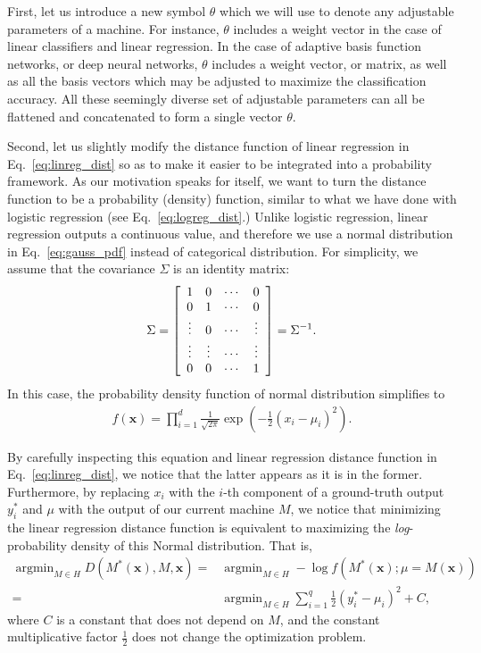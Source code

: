 \documentclass{report}
\newcommand{\vect}[1]{\mathbf{#1}}
\newcommand{\vx}[0]{\vect{x}}
\DeclareMathOperator*{\argmin}{\arg \min}
\begin{document}
First, let us introduce a new symbol $\theta$ which we will use to denote any
adjustable parameters of a machine. For instance, $\theta$ includes a weight
vector in the case of linear classifiers and linear regression. In the case of
adaptive basis function networks, or deep neural networks, $\theta$ includes a
weight vector, or matrix, as well as all the basis vectors which may be adjusted
to maximize the classification accuracy. All these seemingly diverse set of
adjustable parameters can all be flattened and concatenated to form a single
vector $\theta$. 

Second, let us slightly modify the distance function of linear regression in
Eq.~\eqref{eq:linreg_dist} so as to make it easier to be integrated into a
probability framework. As our motivation speaks for itself, we want to turn the
distance function to be a probability (density) function, similar to what we
have done with logistic regression (see Eq.~\eqref{eq:logreg_dist}.) Unlike
logistic regression, linear regression outputs a continuous value, and therefore
we use a normal distribution in Eq.~\eqref{eq:gauss_pdf} instead of categorical
distribution. For simplicity, we assume that the covariance $\Sigma$ is an
identity matrix:
\begin{align*}
    \Sigma = 
    \left[
        \begin{array}{c c c c}
            1 & 0 & \cdots & 0 \\
            0 & 1 & \cdots & 0 \\
            \vdots & 0 & \cdots & \vdots \\
            \vdots & \vdots & \cdots & \vdots \\
            0 & 0 & \cdots & 1 
        \end{array}
    \right] = \Sigma^{-1}.
\end{align*}
In this case, the probability density function of normal distribution simplifies
to 
\begin{align}
    \label{eq:gauss_pdf_identity}
    f(\vx) = \prod_{i=1}^d 
    \frac{1}{\sqrt{2\pi}}
    \exp\left(
        -\frac{1}{2} (x_i - \mu_i)^2
    \right).
\end{align}

By carefully inspecting this equation and linear regression distance function in
Eq.~\eqref{eq:linreg_dist}, we notice that the latter appears as it is in the
former. Furthermore, by replacing $x_i$ with the $i$-th component of a
ground-truth output $y^*_i$ and $\mu$ with the output of our current machine
$M$, we notice that minimizing the linear regression distance function is
equivalent to maximizing the {\it log}-probability density of this Normal
distribution. That is,
\begin{align}
    \label{eq:linreg_nll}
    \argmin_{M \in H} D(M^*(\vx), M, \vx) =&
    \argmin_{M \in H} -\log f(M^*(\vx); \mu=M(\vx)) \\
    =&\argmin_{M \in H} \sum_{i=1}^q \frac{1}{2} (y^*_i - \mu_i)^2 + C,
\end{align}
where $C$ is a constant that does not depend on $M$, and the constant
multiplicative factor $\frac{1}{2}$ does not change the optimization problem.
\end{document}

